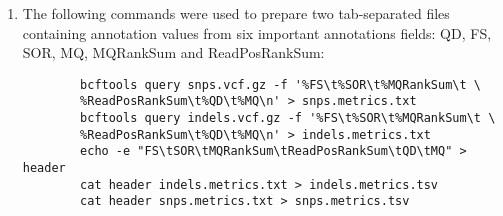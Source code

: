 \begin{enumerate}
	\begin{verbatim}
		grep ">" UMD3.1_chromosomes.fa
		output:
		>gnl|UMD3.1|GK000010.2 Chromosome 10 AC_000167.1
		>gnl|UMD3.1|GK000011.2 Chromosome 11 AC_000168.1
		>gnl|UMD3.1|GK000012.2 Chromosome 12 AC_000169.1
		...
		>gnl|UMD3.1|GK000009.2 Chromosome 9 AC_000166.1
		>gnl|UMD3.1|AY526085.1 Chromosome MT NC_006853.1
		>gnl|UMD3.1|GK000030.2 Chromosome X AC_000187.1
		>gnl|UMD3.1|GJ057137.1 GPS_000341577.1 NW_003097882.1
		>gnl|UMD3.1|GJ057138.1 GPS_000341578.1 NW_003097883.1
		...
	\end{verbatim}
	
	In contrast, the chromosomes entries in the STAR genome are quite different:
	
	\begin{verbatim}
		cat Bos_taurus.UMD3.1.87_index/chrName.txt | head -n 32
		output:
		1
		10
		11
		...
		9
		MT
		X
		GJ058422.1
	\end{verbatim}
	
	Therefore, the chromosome identifiers found in the \textit{Bos taurus} UMD3.1 genome need to be changed to match their counterparts in the STAR genome. This could be achieved with UNIX SED:
	
	\begin{verbatim}
		sed -r s'/^>.+Chromosome\s+(\S+)\s+.+/>\1/' UMD3.1_chromosomes.fa \
		> temp1.fa
		grep ">" temp1.fa | head -n 40
		
		# Handle unassigned scaffolds (accessions that begin with "GJ").
		sed -r s'/^>gnl\|UMD3\.1\|(\S+)+\s+.+/>\1/' temp1.fa > temp2.fa
		grep ">" temp2.fa | tail -n +30 | head -n 10
		mv temp2.fa refGenome.fasta
		rm temp1.fa
	\end{verbatim}
	
	
	\item 	
	The following commands were used to prepare two tab-separated files containing annotation values from six important annotations fields: QD,  FS, SOR, MQ, MQRankSum and ReadPosRankSum:
	
	\begin{verbatim}
		bcftools query snps.vcf.gz -f '%FS\t%SOR\t%MQRankSum\t \
		%ReadPosRankSum\t%QD\t%MQ\n' > snps.metrics.txt
		bcftools query indels.vcf.gz -f '%FS\t%SOR\t%MQRankSum\t \
		%ReadPosRankSum\t%QD\t%MQ\n' > indels.metrics.txt
		echo -e "FS\tSOR\tMQRankSum\tReadPosRankSum\tQD\tMQ" > header
		cat header indels.metrics.txt > indels.metrics.tsv
		cat header snps.metrics.txt > snps.metrics.tsv
	\end{verbatim}
	

\end{enumerate}
